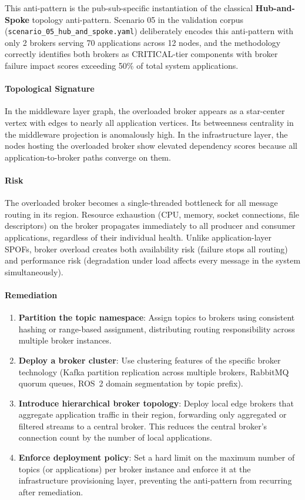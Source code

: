\documentclass[11pt]{article}
\begin{document}
This anti-pattern is the pub-sub-specific instantiation of the classical \textbf{Hub-and-Spoke} topology anti-pattern. Scenario 05 in the validation corpus (\texttt{scenario\_05\_hub\_and\_spoke.yaml}) deliberately encodes this anti-pattern with only 2 brokers serving 70 applications across 12 nodes, and the methodology correctly identifies both brokers as CRITICAL-tier components with broker failure impact scores exceeding 50\% of total system applications.

\paragraph{Topological Signature}
In the middleware layer graph, the overloaded broker appears as a star-center vertex with edges to nearly all application vertices. Its betweenness centrality in the middleware projection is anomalously high. In the infrastructure layer, the nodes hosting the overloaded broker show elevated dependency scores because all application-to-broker paths converge on them.

\paragraph{Risk}
The overloaded broker becomes a single-threaded bottleneck for all message routing in its region. Resource exhaustion (CPU, memory, socket connections, file descriptors) on the broker propagates immediately to all producer and consumer applications, regardless of their individual health. Unlike application-layer SPOFs, broker overload creates both availability risk (failure stops all routing) and performance risk (degradation under load affects every message in the system simultaneously).

\paragraph{Remediation}
\begin{enumerate}[leftmargin=*]
\item \textbf{Partition the topic namespace}: Assign topics to brokers using consistent hashing or range-based assignment, distributing routing responsibility across multiple broker instances.
\item \textbf{Deploy a broker cluster}: Use clustering features of the specific broker technology (Kafka partition replication across multiple brokers, RabbitMQ quorum queues, ROS~2 domain segmentation by topic prefix).
\item \textbf{Introduce hierarchical broker topology}: Deploy local edge brokers that aggregate application traffic in their region, forwarding only aggregated or filtered streams to a central broker. This reduces the central broker's connection count by the number of local applications.
\item \textbf{Enforce deployment policy}: Set a hard limit on the maximum number of topics (or applications) per broker instance and enforce it at the infrastructure provisioning layer, preventing the anti-pattern from recurring after remediation.
\end{enumerate}
\end{document}
